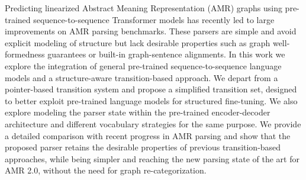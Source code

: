 Predicting linearized Abstract Meaning Representation (AMR) graphs using pre-trained sequence-to-sequence Transformer models has recently led to large improvements on AMR parsing benchmarks. These parsers are simple and avoid explicit modeling of structure but lack desirable properties such as graph well-formedness guarantees or built-in graph-sentence alignments. In this work we explore the integration of general pre-trained sequence-to-sequence language models and a structure-aware transition-based approach. We depart from a pointer-based transition system and propose a simplified transition set, designed to better exploit pre-trained language models for structured fine-tuning. We also explore modeling the parser state within the pre-trained encoder-decoder architecture and different vocabulary strategies for the same purpose. We provide a detailed comparison with recent progress in AMR parsing and show that the proposed parser retains the desirable properties of previous transition-based approaches, while being simpler and reaching the new parsing state of the art for AMR 2.0, without the need for graph re-categorization.

